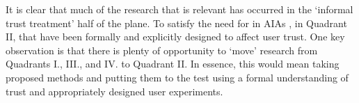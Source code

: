 It is clear that much of the research that is relevant has occurred in the `informal trust treatment' half of the plane. To satisfy the need for  in AIAs ,  in Quadrant II,  that have been formally and explicitly designed to affect user trust. One key observation is that there is plenty of opportunity to `move' research from Quadrants I., III., and IV. to Quadrant II. In essence, this would mean taking proposed methods  and putting them to the test using a formal understanding of trust and appropriately designed user experiments.






